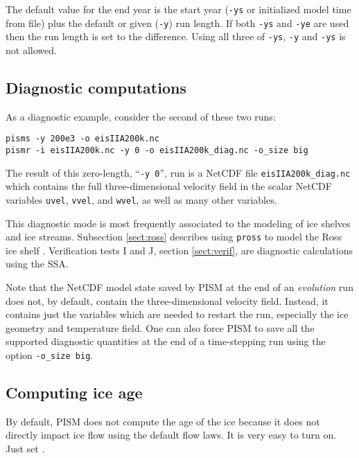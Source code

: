 The default value for the end year is the start year (\texttt{-ys} or initialized model time from file) plus the default or given (\texttt{-y}) run length.  If both \texttt{-ys} and \texttt{-ye} are used then the run length is set to the difference.  Using all three of \texttt{-ys}, \texttt{-y} and \texttt{-ys} is not allowed.


\subsection{Diagnostic computations}  As a diagnostic example, consider the second of these two runs:

\begin{verbatim}
pisms -y 200e3 -o eisIIA200k.nc
pismr -i eisIIA200k.nc -y 0 -o eisIIA200k_diag.nc -o_size big
\end{verbatim}

\noindent The result of this zero-length, ``\texttt{-y 0}'', run is a NetCDF file \texttt{eisIIA200k_diag.nc} which contains the full three-dimensional velocity field in the scalar NetCDF variables \texttt{uvel}, \texttt{vvel}, and \texttt{wvel}, as well as many other variables.

This diagnostic mode is most frequently associated to the modeling of ice shelves and ice streams.  Subsection \ref{sect:ross} describes using \texttt{pross} to model the Ross ice shelf \cite{MacAyealetal}.  Verification tests I and J, section \ref{sect:verif}, are diagnostic calculations using the SSA.

Note that the NetCDF model state saved by PISM at the end of an \emph{evolution} run does not, by default, contain the three-dimensional velocity field.  Instead, it contains just the variables which are needed to restart the run, especially the ice geometry and temperature field.  One can also force PISM to save all the supported diagnostic quantities at the end of a time-stepping run using the option \texttt{-o_size big}.


\subsection{Computing ice age} \label{subsect:age}

By default, PISM does not compute the age of the ice because it does not directly impact ice flow using the default flow laws.   It is very easy to turn on.  Just set .

